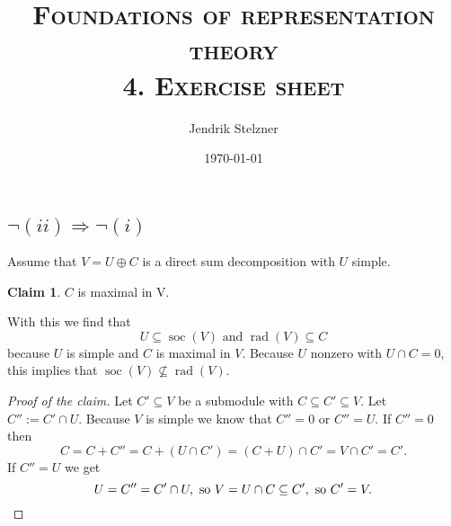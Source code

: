 \documentclass[a4paper,10pt]{article}
\title{\textsc{Foundations of representation theory \\ \Large 4. Exercise sheet}}
\author{Jendrik Stelzner}
\date{\today}
\theoremstyle{definition}
\newtheorem*{claim}{Claim}
\newcommand{\soc}{\operatorname{soc}}
\newcommand{\rad}{\operatorname{rad}}
\begin{document}
\maketitle





\section{}





\section{}





\section{}

\subsection*{$\neg (ii) \Rightarrow \neg (i)$}
Assume that $V = U \oplus C$ is a direct sum decomposition with $U$ simple.
\begin{claim}
 $C$ is maximal in V.
\end{claim}
With this we find that
\[
 U \subseteq \soc(V) \text{ and } \rad(V) \subseteq C
\]
because $U$ is simple and $C$ is maximal in $V$. Because $U$ nonzero with $U \cap C = 0$, this implies that $\soc(V) \nsubseteq \rad(V)$.
\begin{proof}[Proof of the claim]
 Let $C' \subseteq V$ be a submodule with $C \subseteq C' \subseteq V$. Let $C'' := C' \cap U$. Because $V$ is simple we know that $C'' = 0$ or $C'' = U$. If $C'' = 0$ then
 \[
  C = C + C'' = C + (U \cap C') = (C + U) \cap C' = V \cap C' = C'.
 \]
 If $C'' = U$ we get
 \[
  U = C'' = C' \cap U, \text{ so } V = U \cap C \subseteq C', \text{ so } C' = V. \qedhere
 \]
\end{proof}
\end{document}
